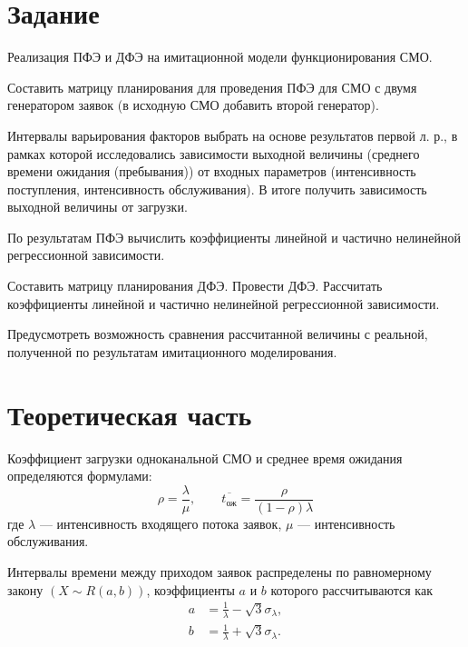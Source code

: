 \documentclass[a4paper, 14pt]{extreport}
\begin{document}


\begin{MainPart}

\section{Задание}

Реализация ПФЭ и ДФЭ на имитационной модели функционирования СМО.

Составить матрицу планирования для проведения ПФЭ для СМО с двумя генератором заявок (в исходную СМО добавить второй генератор).

Интервалы варьирования факторов выбрать на основе результатов первой л. р., в рамках которой исследовались зависимости выходной величины (среднего времени ожидания (пребывания)) от входных параметров (интенсивность поступления, интенсивность обслуживания).
В итоге получить зависимость выходной величины от загрузки.

По результатам ПФЭ вычислить коэффициенты линейной и частично нелинейной регрессионной зависимости.

Составить матрицу планирования ДФЭ.
Провести ДФЭ.
Рассчитать коэффициенты линейной и частично нелинейной регрессионной зависимости.

Предусмотреть возможность сравнения рассчитанной величины с реальной, полученной по результатам имитационного моделирования.


\section{Теоретическая часть}

Коэффициент загрузки одноканальной СМО и среднее время ожидания определяются формулами:
\begin{equation}
	\label{eqn:load-and-wait}
	\rho = \frac\lambda\mu, \qquad \overline{t_{\text{ож}}} = \frac{\rho}{(1 - \rho)\lambda}
\end{equation}
где $\lambda$ — интенсивность входящего потока заявок, $\mu$ — интенсивность обслуживания.

Интервалы времени между приходом заявок распределены по равномерному закону $(X \sim R(a, b))$, коэффициенты $a$ и $b$ которого рассчитываются как
\begin{equation}
	\begin{aligned}
		a &= \frac1\lambda - \sqrt{3}\sigma_\lambda, \\
		b &= \frac1\lambda + \sqrt{3}\sigma_\lambda.
	\end{aligned}
\end{equation}


\end{MainPart}
\end{document}
